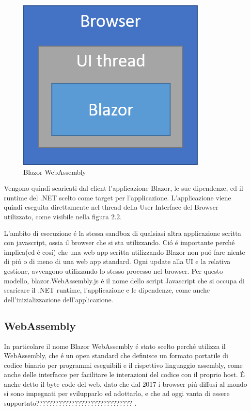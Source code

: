 \begin{figure}[H]
	\centerline{\includegraphics[scale=0.6]{figure/blazor-WebAssembly.png}}
	\caption{Blazor WebAssembly}
	\label{fig:BlazorWebAssembly}
\end{figure}

Vengono quindi scaricati dal client l'applicazione Blazor, le sue dipendenze, ed il runtime del .NET scelto come target per l'applicazione.
L'applicazione viene quindi eseguita direttamente nel thread della User Interface del Browser utilizzato, come visibile nella figura 2.2.

L'ambito di esecuzione \'e la stessa sandbox di qualsiasi altra applicazione scritta con javascript, ossia il browser che si sta utilizzando.
Ci\'o \'e importante perch\'e implica(ed \'e cos\'i) che una web app scritta utilizzando Blazor non pu\'o fare niente di pi\'u o di meno di una web app standard.
Ogni update alla UI e la relativa gestione, avvengono utilizzando lo stesso processo nel browser.
Per questo modello, blazor.WebAssembly.js \'e il nome dello script Javascript che si occupa di scaricare il .NET runtime, l'applicazione e le dipendenze, come anche dell'inizializzazione dell'applicazione.

\subsection{WebAssembly}\label{sez:webAssembly}
In particolare il nome Blazor WebAssembly \'e stato scelto perch\'e utilizza il WebAssembly, che \'e un open standard che definisce un formato portatile di codice binario per programmi eseguibili e il rispettivo linguaggio assembly, come anche delle interfacce per facilitare le interazioni del codice con il proprio host.
\'E anche detto il byte code del web, dato che dal 2017 i browser pi\'u diffusi al mondo si sono impegnati per svilupparlo ed adottarlo, e che ad oggi vanta di essere supportato?????????????????????????????? .\cite{webAssemblySupport}
\pagebreak


